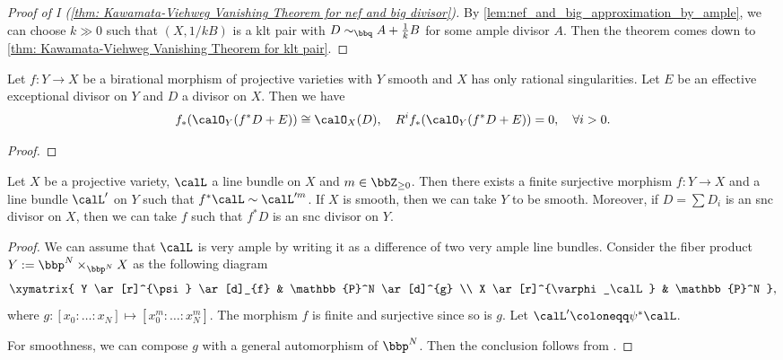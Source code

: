     \begin{proof}[Proof of I (\cref{thm: Kawamata-Viehweg Vanishing Theorem for nef and big divisor})]
        By \cref{lem:nef_and_big_approximation_by_ample}, we can choose \(k \gg 0\) such that \((X,1/k B)\) is a klt pair with \(D \sim_\bbq A + \frac{1}{k}B\) for some ample divisor \(A\).
        Then the theorem comes down to \cref{thm: Kawamata-Viehweg Vanishing Theorem for klt pair}.
    \end{proof}

    \begin{lemma}\label{lem:higher_direct_image_of_exceptional_divisor}
        Let \(f:Y \to X\) be a birational morphism of projective varieties with \(Y\) smooth and \(X\) has only rational singularities.
        Let \(E\) be an effective exceptional divisor on \(Y\) and \(D\) a divisor on \(X\).
        Then we have
        \[ f_*(\calO_Y(f^*D + E)) \cong \calO_X(D), \quad R^if_*(\calO_Y(f^*D + E)) = 0,\quad \forall i > 0. \]
    \end{lemma}
    \begin{proof}
    \end{proof}

    \begin{lemma}\label{lem: divide a divisor by a finite surjective morphism}
        Let \(X\) be a projective variety, \(\calL\) a line bundle on \(X\) and \(m \in \bbZ_{\geq 0}\).
        Then there exists a finite surjective morphism \(f: Y \to X\) and a line bundle \(\calL'\) on \(Y\) such that \(f^*\calL \sim \calL'^{m}\).
        If \(X\) is smooth, then we can take \(Y\) to be smooth.
        Moreover, if \(D = \sum D_i\) is an snc divisor on \(X\), then we can take \(f\) such that \(f^*D\) is an snc divisor on \(Y\).
    \end{lemma}
    \begin{proof}
        We can assume that \(\calL\) is very ample by writing it as a difference of two very ample line bundles.
        Consider the fiber product \(Y:= \bbp^N \times_{\bbp^N} X\) as the following diagram
        \[ \xymatrix{
            Y \ar[r]^{\psi} \ar[d]_{f} & \mathbb{P}^N \ar[d]^{g} \\
            X \ar[r]^{\varphi_\calL} & \mathbb{P}^N
        }, \]
        where \(g: [x_0: \ldots: x_N] \mapsto [x_0^m: \ldots: x_N^m]\).
        The morphism \(f\) is finite and surjective since so is \(g\).
        Let \(\calL'\coloneqq \psi^*\calL\).

        For smoothness, we can compose \(g\) with a general automorphism of \(\bbp^N\).
        Then the conclusion follows from \cite[Chapter III, Theorem 10.8]{Har77}.
    \end{proof}

